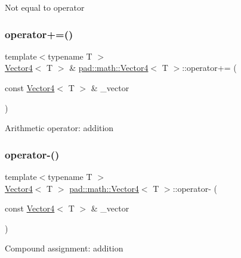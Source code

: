 Not equal to operator \mbox{\label{structpad_1_1math_1_1_vector4_aed8f9c0faacfe13f7985d5f4e4f73d23}} 
\subsubsection{\texorpdfstring{operator+=()}{operator+=()}}
{\footnotesize\ttfamily template$<$typename T $>$ \\
\mbox{\hyperlink{structpad_1_1math_1_1_vector4}{Vector4}}$<$ T $>$ \& \mbox{\hyperlink{structpad_1_1math_1_1_vector4}{pad\+::math\+::\+Vector4}}$<$ T $>$\+::operator+= (\begin{DoxyParamCaption}\item[{const \mbox{\hyperlink{structpad_1_1math_1_1_vector4}{Vector4}}$<$ T $>$ \&}]{\+\_\+vector }\end{DoxyParamCaption})}

Arithmetic operator\+: addition \mbox{\label{structpad_1_1math_1_1_vector4_a05cc7e4f760aae9610025584d1608b50}} 
\subsubsection{\texorpdfstring{operator-\/()}{operator-()}}
{\footnotesize\ttfamily template$<$typename T $>$ \\
\mbox{\hyperlink{structpad_1_1math_1_1_vector4}{Vector4}}$<$ T $>$ \mbox{\hyperlink{structpad_1_1math_1_1_vector4}{pad\+::math\+::\+Vector4}}$<$ T $>$\+::operator-\/ (\begin{DoxyParamCaption}\item[{const \mbox{\hyperlink{structpad_1_1math_1_1_vector4}{Vector4}}$<$ T $>$ \&}]{\+\_\+vector }\end{DoxyParamCaption})}

Compound assignment\+: addition \mbox{\label{structpad_1_1math_1_1_vector4_ae27aa6827d54b1b0033ee99e79d19660}} 
